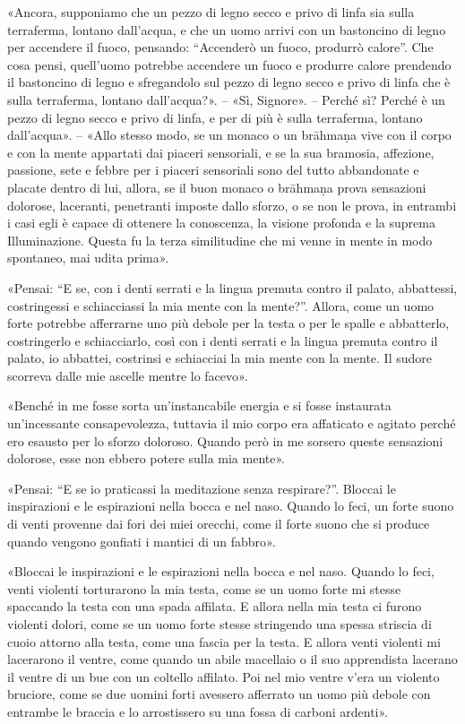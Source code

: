 «Ancora, supponiamo che un pezzo di legno secco e privo di linfa sia sulla
terraferma, lontano dall’acqua, e che un uomo arrivi con un bastoncino di legno
per accendere il fuoco, pensando: “Accenderò un fuoco, produrrò calore”. Che
cosa pensi, quell’uomo potrebbe accendere un fuoco e produrre calore prendendo
il bastoncino di legno e sfregandolo sul pezzo di legno secco e privo di linfa
che è sulla terraferma, lontano dall’acqua?». – «Sì, Signore». – Perché sì?
Perché è un pezzo di legno secco e privo di linfa, e per di più è sulla
terraferma, lontano dall’acqua». – «Allo stesso modo, se un monaco o un brāhmaṇa
vive con il corpo e con la mente appartati dai piaceri sensoriali, e se la sua
bramosia, affezione, passione, sete e febbre per i piaceri sensoriali sono del
tutto abbandonate e placate dentro di lui, allora, se il buon monaco o brāhmaṇa
prova sensazioni dolorose, laceranti, penetranti imposte dallo sforzo, o se non
le prova, in entrambi i casi egli è capace di ottenere la conoscenza, la visione
profonda e la suprema Illuminazione. Questa fu la terza similitudine che mi
venne in mente in modo spontaneo, mai udita prima».

«Pensai: “E se, con i denti serrati e la lingua premuta contro il palato,
abbattessi, costringessi e schiacciassi la mia mente con la mente?”. Allora,
come un uomo forte potrebbe afferrarne uno più debole per la testa o per le
spalle e abbatterlo, costringerlo e schiacciarlo, così con i denti serrati e la
lingua premuta contro il palato, io abbattei, costrinsi e schiacciai la mia
mente con la mente. Il sudore scorreva dalle mie ascelle mentre lo facevo».

«Benché in me fosse sorta un’instancabile energia e si fosse instaurata
un’incessante consapevolezza, tuttavia il mio corpo era affaticato e agitato
perché ero esausto per lo sforzo doloroso. Quando però in me sorsero queste
sensazioni dolorose, esse non ebbero potere sulla mia mente».

«Pensai: “E se io praticassi la meditazione senza respirare?”. Bloccai le
inspirazioni e le espirazioni nella bocca e nel naso. Quando lo feci, un forte
suono di venti provenne dai fori dei miei orecchi, come il forte suono che si
produce quando vengono gonfiati i mantici di un fabbro».

«Bloccai le inspirazioni e le espirazioni nella bocca e nel naso. Quando lo
feci, venti violenti torturarono la mia testa, come se un uomo forte mi stesse
spaccando la testa con una spada affilata. E allora nella mia testa ci furono
violenti dolori, come se un uomo forte stesse stringendo una spessa striscia di
cuoio attorno alla testa, come una fascia per la testa. E allora venti violenti
mi lacerarono il ventre, come quando un abile macellaio o il suo apprendista
lacerano il ventre di un bue con un coltello affilato. Poi nel mio ventre v’era
un violento bruciore, come se due uomini forti avessero afferrato un uomo più
debole con entrambe le braccia e lo arrostissero su una fossa di carboni
ardenti».


